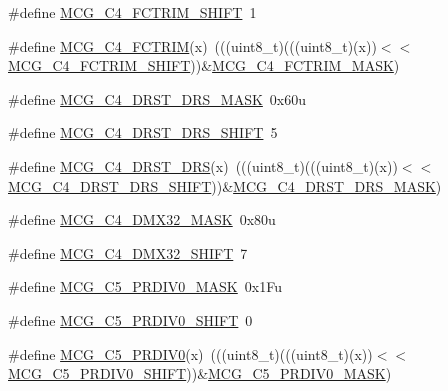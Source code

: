 \begin{DoxyCompactItemize}
\item 
\#define \hyperlink{group___m_c_g___register___masks_ga0a1b1f2be0b8e9afc3ff91ab11d71a1e}{M\+C\+G\+\_\+\+C4\+\_\+\+F\+C\+T\+R\+I\+M\+\_\+\+S\+H\+I\+FT}~1
\item 
\#define \hyperlink{group___m_c_g___register___masks_ga7ffe6f164c3d7440b9911c8de59b7171}{M\+C\+G\+\_\+\+C4\+\_\+\+F\+C\+T\+R\+IM}(x)~(((uint8\+\_\+t)(((uint8\+\_\+t)(x))$<$$<$\hyperlink{group___m_c_g___register___masks_ga0a1b1f2be0b8e9afc3ff91ab11d71a1e}{M\+C\+G\+\_\+\+C4\+\_\+\+F\+C\+T\+R\+I\+M\+\_\+\+S\+H\+I\+FT}))\&\hyperlink{group___m_c_g___register___masks_ga91610035649d14c5027419db0bfa3231}{M\+C\+G\+\_\+\+C4\+\_\+\+F\+C\+T\+R\+I\+M\+\_\+\+M\+A\+SK})
\item 
\#define \hyperlink{group___m_c_g___register___masks_ga7f6629e8d17efb2cec3d2f63d09ede5a}{M\+C\+G\+\_\+\+C4\+\_\+\+D\+R\+S\+T\+\_\+\+D\+R\+S\+\_\+\+M\+A\+SK}~0x60u
\item 
\#define \hyperlink{group___m_c_g___register___masks_ga27d4baa0c8a770f1f67ab47e6407e948}{M\+C\+G\+\_\+\+C4\+\_\+\+D\+R\+S\+T\+\_\+\+D\+R\+S\+\_\+\+S\+H\+I\+FT}~5
\item 
\#define \hyperlink{group___m_c_g___register___masks_gaf074d694a596e6e92614fd435c9ccb35}{M\+C\+G\+\_\+\+C4\+\_\+\+D\+R\+S\+T\+\_\+\+D\+RS}(x)~(((uint8\+\_\+t)(((uint8\+\_\+t)(x))$<$$<$\hyperlink{group___m_c_g___register___masks_ga27d4baa0c8a770f1f67ab47e6407e948}{M\+C\+G\+\_\+\+C4\+\_\+\+D\+R\+S\+T\+\_\+\+D\+R\+S\+\_\+\+S\+H\+I\+FT}))\&\hyperlink{group___m_c_g___register___masks_ga7f6629e8d17efb2cec3d2f63d09ede5a}{M\+C\+G\+\_\+\+C4\+\_\+\+D\+R\+S\+T\+\_\+\+D\+R\+S\+\_\+\+M\+A\+SK})
\item 
\#define \hyperlink{group___m_c_g___register___masks_ga5d16ac35cf87b3cdeeefca1c16a0eda0}{M\+C\+G\+\_\+\+C4\+\_\+\+D\+M\+X32\+\_\+\+M\+A\+SK}~0x80u
\item 
\#define \hyperlink{group___m_c_g___register___masks_ga12d73b2d4a4fd1f2fb21a1cbe87aaa83}{M\+C\+G\+\_\+\+C4\+\_\+\+D\+M\+X32\+\_\+\+S\+H\+I\+FT}~7
\item 
\#define \hyperlink{group___m_c_g___register___masks_ga28ab0b9007f9941707395660db088172}{M\+C\+G\+\_\+\+C5\+\_\+\+P\+R\+D\+I\+V0\+\_\+\+M\+A\+SK}~0x1\+Fu
\item 
\#define \hyperlink{group___m_c_g___register___masks_ga452026beec3bec5a580d151e15d83f30}{M\+C\+G\+\_\+\+C5\+\_\+\+P\+R\+D\+I\+V0\+\_\+\+S\+H\+I\+FT}~0
\item 
\#define \hyperlink{group___m_c_g___register___masks_gaff29a787086eaba9ef46f4e873d83a54}{M\+C\+G\+\_\+\+C5\+\_\+\+P\+R\+D\+I\+V0}(x)~(((uint8\+\_\+t)(((uint8\+\_\+t)(x))$<$$<$\hyperlink{group___m_c_g___register___masks_ga452026beec3bec5a580d151e15d83f30}{M\+C\+G\+\_\+\+C5\+\_\+\+P\+R\+D\+I\+V0\+\_\+\+S\+H\+I\+FT}))\&\hyperlink{group___m_c_g___register___masks_ga28ab0b9007f9941707395660db088172}{M\+C\+G\+\_\+\+C5\+\_\+\+P\+R\+D\+I\+V0\+\_\+\+M\+A\+SK})
$$
\end{DoxyCompactItemize}
